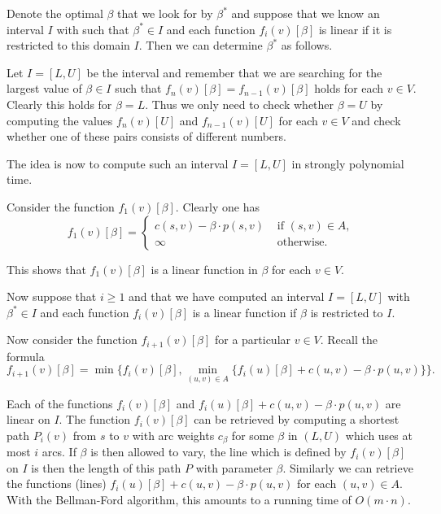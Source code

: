 Denote the optimal $\beta$ that we look for by $\beta^*$ and suppose that we
know an interval $I$ with such that $\beta^* \in I$ and each function
$f_i(v)[\beta]$ is linear if it is restricted to this domain $I$. Then we
can determine $\beta^*$ as follows.

Let $I = [L,U]$ be the interval and  remember that we are searching for the
largest value of $\beta \in I$ such that $f_{n}(v)[\beta]=f_{n-1}(v)[\beta]$
holds for each $v \in V$. Clearly this holds for $\beta = L$. Thus we only
need to check whether $\beta = U$ by computing the values $f_{n}(v)[U]$
and $f_{n-1}(v)[U]$ for each $v \in V$ and check whether one of these
pairs consists of different numbers. 


The idea is now to compute such an interval $I = [L,U]$ in strongly
polynomial time. 

Consider the function $f_1(v)[\beta]$. Clearly one has 
\begin{displaymath}
f_1(v)[\beta] = 
  \begin{cases}
    c(s,v) - \beta \cdot p(s,v) &  \text{ if } (s,v)\in A, \\
    \infty                  & \text{ otherwise}. 
  \end{cases}
\end{displaymath}

This shows that $f_1(v)[\beta]$ is a linear function in $\beta$ for each $v
\in V$. 

Now suppose that $i\geq1$ and that we have computed an interval
$I=[L,U]$ with  $\beta^*\in I$ and each function $f_i(v)[\beta]$ is a linear
function if $\beta$ is restricted to $I$. 

Now consider the function  $f_{i+1}(v)[\beta]$ for a particular $v \in
V$. Recall the formula 
\begin{equation}
  \label{f:eq:1}
  f_{i+1}(v)[\beta] = \min\{ f_i(v)[\beta], \min_{(u,v)\in A} \{ f_i(u)[\beta] +
  c(u,v) - \beta \cdot p(u,v)\} \}. 
\end{equation}


Each of the functions $ f_i(v)[\beta]$ and $ f_i(u)[\beta] +  c(u,v) - \beta
\cdot p(u,v)$  are linear on $I$.  The function $f_i(v)[\beta]$ can be retrieved by
computing a shortest path $P_i(v)$ from $s$ to $v$ with arc weights $c_\beta$ for
some $\beta$ in $(L,U)$ which uses at most $i$ arcs. If $\beta$ is then
allowed to vary, the line which is defined by $f_i(v)[\beta]$ on $I$ is
then the length of this path $P$   with parameter $\beta$.  Similarly we
can retrieve the functions (lines) $ f_i(u)[\beta] +  c(u,v) - \beta
\cdot p(u,v)$  for each $(u,v) \in A$. With the Bellman-Ford algorithm,
this amounts to a running time of $O(m \cdot n)$. 

